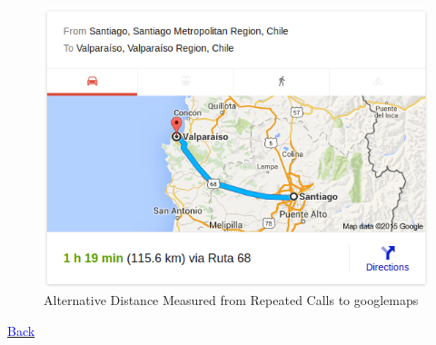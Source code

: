\documentclass[10pt,letterpaper,subeqn]{beamer}
\begin{document}
\begin{frame}[label=distance]
\begin{figure}
\begin{center}
\caption{Alternative Distance Measured from Repeated Calls to googlemaps}
\includegraphics[scale=0.5]{./figures/mapDistance.png}
\end{center}
\end{figure}
\hyperlink{robust}{\textcolor{blue}{Back}}
\end{frame}
\end{document}
